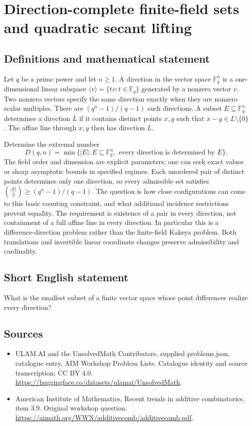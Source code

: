 \documentclass[11pt,a4paper]{article}
\begin{document}
\section*{Direction-complete finite-field sets and quadratic secant lifting}\label{statement}

\subsection{Definitions and mathematical statement}
Let $q$ be a prime power and let $n\geq1$.
A direction in the vector space $\mathbb F_q^n$ is a one-dimensional linear subspace
$\langle v\rangle=\{tv:t\in\mathbb F_q\}$ generated by a nonzero vector $v$.
Two nonzero vectors specify the same direction exactly when they are nonzero scalar multiples.
There are $(q^n-1)/(q-1)$ such directions.
A subset $E\subseteq\mathbb F_q^n$ determines a direction $L$ if it contains distinct points $x,y$ such that $x-y\in L\setminus\{0\}$.
The affine line through $x,y$ then has direction $L$.

Determine the extremal number
\[
 D(q,n)=\min\{|E|:E\subseteq\mathbb F_q^n,
    \text{ every direction is determined by }E\}.
\]
The field order and dimension are explicit parameters; one can seek exact values or sharp asymptotic bounds in specified regimes.
Each unordered pair of distinct points determines only one direction, so every admissible set satisfies
$\binom{|E|}{2}\geq(q^n-1)/(q-1)$.
The question is how close configurations can come to this basic counting constraint, and what additional incidence restrictions prevent equality.
The requirement is existence of a pair in every direction, not containment of a full affine line in every direction.
In particular this is a difference-direction problem rather than the finite-field Kakeya problem.
Both translations and invertible linear coordinate changes preserve admissibility and cardinality.
\subsection{Short English statement}
What is the smallest subset of a finite vector space whose point differences realize every direction?
\subsection{Sources}
\begin{itemize}
\item[S1] ULAM.AI and the UnsolvedMath Contributors, supplied problems.json, catalogue entry, AIM Workshop Problem Lists. Catalogue identity and source transcription; CC BY 4.0.
\url{https://huggingface.co/datasets/ulamai/UnsolvedMath}.
\item[S2] American Institute of Mathematics, Recent trends in additive combinatorics, item 3.9. Original workshop question.
\url{https://aimath.org/WWN/additivecomb/additivecomb.pdf}.
\end{itemize}
\end{document}
